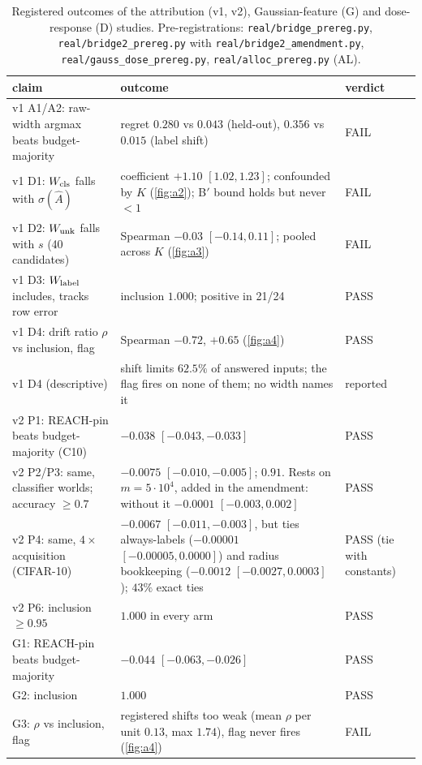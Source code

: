\begin{table}[!htbp]
\centering\footnotesize
\caption{Registered outcomes of the attribution (v1, v2), Gaussian-feature (G) and dose-response (D)
studies. Pre-registrations: \texttt{real/bridge\_prereg.py}, \texttt{real/bridge2\_prereg.py} with
\texttt{real/bridge2\_amendment.py}, \texttt{real/gauss\_dose\_prereg.py}, \texttt{real/alloc\_prereg.py} (AL).}
\label{tab:outcomes-late}
\begin{tabular}{p{4.6cm}p{7.6cm}p{1.2cm}}
\toprule
claim & outcome & verdict \\
\midrule
v1 A1/A2: raw-width argmax beats budget-majority & regret $0.280$ vs $0.043$ (held-out), $0.356$ vs $0.015$ (label shift) & FAIL \\
v1 D1: $W_{\mathrm{cls}}$ falls with $\sigma(\hat A)$ & coefficient $+1.10$ $[1.02,1.23]$; confounded by $K$ (\cref{fig:a2}); B$'$ bound holds but never $<1$ & FAIL \\
v1 D2: $W_{\mathrm{unk}}$ falls with $s$ (40 candidates) & Spearman $-0.03$ $[-0.14,0.11]$; pooled across $K$ (\cref{fig:a3}) & FAIL \\
v1 D3: $W_{\mathrm{label}}$ includes, tracks row error & inclusion $1.000$; positive in 21/24 & PASS \\
v1 D4: drift ratio $\rho$ vs inclusion, flag & Spearman $-0.72$, $+0.65$ (\cref{fig:a4}) & PASS \\
v1 D4 (descriptive) & shift limits $62.5\%$ of answered inputs; the flag fires on none of them; no width names it & reported \\
v2 P1: REACH-pin beats budget-majority (C10) & $-0.038$ $[-0.043,-0.033]$ & PASS \\
v2 P2/P3: same, classifier worlds; accuracy $\ge0.7$ & $-0.0075$ $[-0.010,-0.005]$; $0.91$. Rests on $m=5\cdot10^4$, added in the amendment: without it $-0.0001$ $[-0.003,0.002]$ & PASS \\
v2 P4: same, $4\times$ acquisition (CIFAR-10) & $-0.0067$ $[-0.011,-0.003]$, but ties always-labels ($-0.00001$ $[-0.00005,0.0000]$) and radius bookkeeping ($-0.0012$ $[-0.0027,0.0003]$); $43\%$ exact ties & PASS (tie with constants) \\
v2 P6: inclusion $\ge0.95$ & $1.000$ in every arm & PASS \\
G1: REACH-pin beats budget-majority & $-0.044$ $[-0.063,-0.026]$ & PASS \\
G2: inclusion & $1.000$ & PASS \\
G3: $\rho$ vs inclusion, flag & registered shifts too weak (mean $\rho$ per unit $0.13$, max $1.74$), flag never fires (\cref{fig:a4}) & FAIL \\

\end{tabular}
\end{table}
